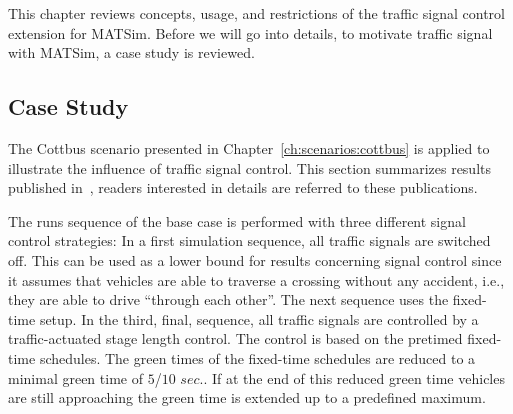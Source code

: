 This chapter reviews concepts, usage, and restrictions of the traffic signal control extension for MATSim. 
Before we will go into details, to motivate traffic signal with MATSim, a case study is reviewed. 
%

\subsection{Case Study}

The Cottbus scenario presented in Chapter~\ref{ch:scenarios:cottbus} is applied to illustrate the influence of traffic signal control. 
This section summarizes results published in~\citet{GretherBischoffNagel2011CottbusSylviaEventAbstract,Grether2014PhD}, readers interested in details are referred to these publications. 

%
The runs sequence of the base case is performed with three different signal control strategies:
%
In a first simulation sequence, all traffic signals are switched off. This can be used as a lower bound for results concerning signal control since it assumes that vehicles are able to traverse a crossing without any accident, i.e., they are able to drive ``through each other''. 
%
The next sequence uses the fixed-time setup. 
%
In the third, final, sequence, all traffic signals are controlled by a traffic-actuated stage length control. 
The control is based on the pretimed fixed-time schedules. 
The green times of the fixed-time schedules are reduced to a minimal green time of $5$/$10$ $sec.$. 
If at the end of this reduced green time vehicles are still approaching the green time is extended up to a predefined maximum. 

